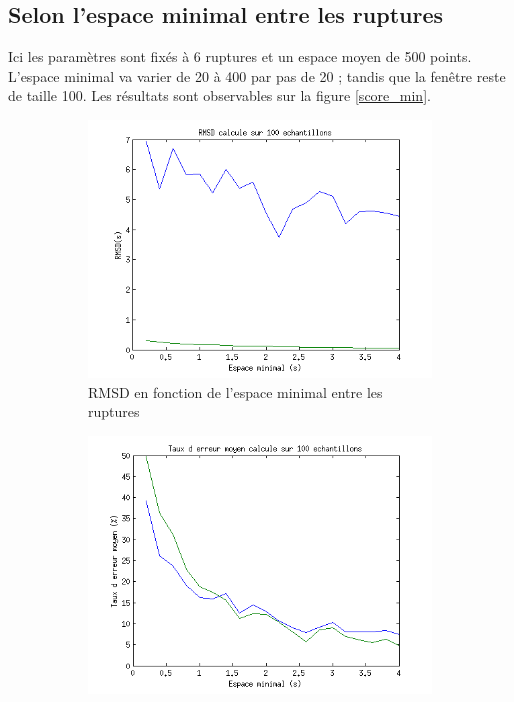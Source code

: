 \documentclass[french,11pt,notitlepage]{report}
\begin{document}
	
	\subsection{Selon l'espace minimal entre les ruptures}
	
	Ici les paramètres sont fixés à 6 ruptures et un espace moyen de 500 points.
	L'espace minimal va varier de 20 à 400 par pas de 20 ;
	tandis que la fenêtre reste de taille 100.
	Les résultats sont observables sur la figure \ref{score_min}.
	
	\begin{figure}[hp]
		\begin{subfigure}[t]{.49\textwidth}
		  \includegraphics[width=\linewidth,height=.24\textheight]{rmsd_min}
			\caption{RMSD en fonction de l'espace minimal entre les ruptures}
			\label{}
		\end{subfigure}
		\hfill
		\begin{subfigure}[t]{.49\textwidth}
			\includegraphics[width=\linewidth,height=.24\textheight]{erratemean_min}

\end{subfigure}
\end{figure}
\end{document}
